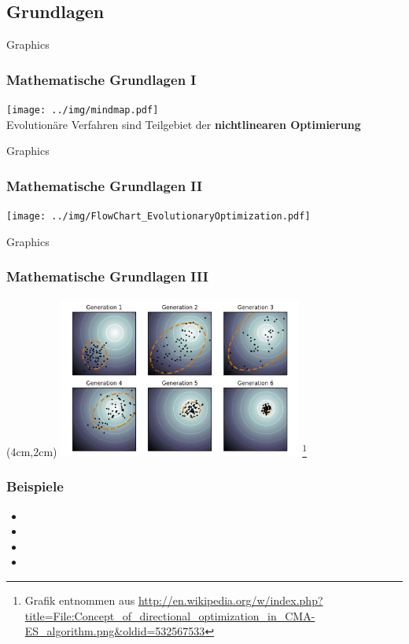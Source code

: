 \subsection{Grundlagen}
\begin{frame}{Graphics} 
	\frametitle{Mathematische Grundlagen I }
	\centering
	\texttt{[image: ../img/mindmap.pdf]}\\
	\tiny Evolutionäre Verfahren sind Teilgebiet der \textbf{nichtlinearen Optimierung}
\end{frame}
\begin{frame}{Graphics} 
  	\frametitle{Mathematische Grundlagen II}
  	\centering
	\texttt{[image: ../img/FlowChart\_EvolutionaryOptimization.pdf]}
\end{frame}
\begin{frame}{Graphics} 
  	\frametitle{Mathematische Grundlagen III}
%  	
  	\begin{textblock*}{8cm}(4cm,2cm) %
  		\includegraphics[width=8cm]{../img/Concept_of_directional_optimization_in_CMA-ES_algorithm.png}
  		\footnote{Grafik entnommen aus \url{http://en.wikipedia.org/w/index.php?title=File:Concept_of_directional_optimization_in_CMA-ES_algorithm.png&oldid=532567533}}
  	\end{textblock*}
%  	
\end{frame}
\begin{frame} %
  \frametitle{Beispiele}
%  
  \begin{itemize}
	\item{}
	\item{}
	\item{}
	\item{}
  \end{itemize}
%  
\end{frame}
